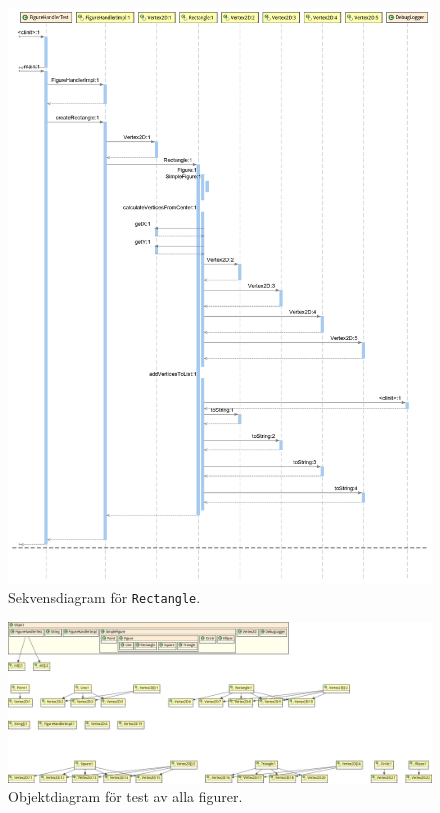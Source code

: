 \begin{figure}[ht]
\centering
\includegraphics[width=\linewidth]{diagram/figureHandlerTest_Rectangle_Sequence-Diagram.png}
\caption{Sekvensdiagram för \texttt{Rectangle}.
}
\label{fig:sekv-rect}
\end{figure}

\begin{figure}
\centering
\includegraphics[width=\linewidth]{diagram/figureHandlerTest_All_Object-Diagram.png}
\caption{Objektdiagram för test av alla figurer.
}
\label{fig:obj-all}
\end{figure}

